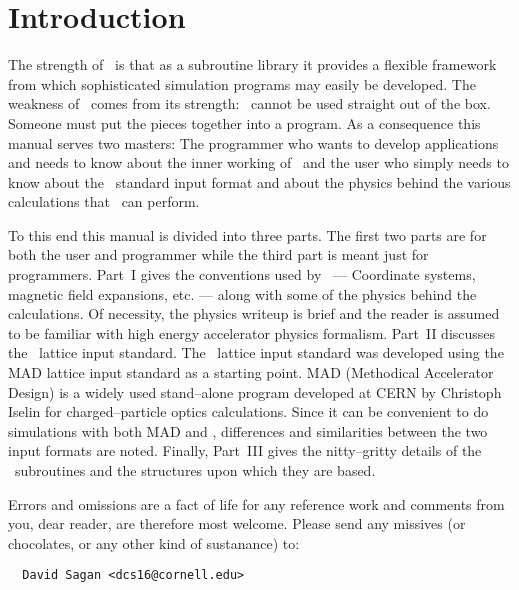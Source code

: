 \section*{Introduction}

The strength of \bmad\ is that as a subroutine library it provides a
flexible framework from which sophisticated simulation programs may
easily be developed.  The weakness of \bmad\ comes from its strength:
\bmad\ cannot be used straight out of the box. Someone must put the
pieces together into a program. As a consequence this manual serves
two masters: The programmer who wants to develop applications and
needs to know about the inner working of \bmad\ and the user who simply 
needs to know about
the \bmad\ standard input format and about the physics behind the various
calculations that \bmad\ can perform.

To this end this manual is divided into three parts. The first two
parts are for both the user and programmer while the third part is
meant just for programmers. Part~I gives the conventions used by
\bmad\ --- Coordinate systems, magnetic field expansions, etc. ---
along with some of the physics behind the calculations. Of necessity,
the physics writeup is brief and the reader is assumed to be familiar
with high energy accelerator physics formalism. Part~II discusses the
\bmad\ lattice input standard.  The \bmad\ lattice input standard was
developed using the MAD lattice input standard as a starting
point. MAD (Methodical Accelerator Design) is a widely used
stand--alone program developed at CERN by Christoph Iselin for
charged--particle optics calculations. Since it can be convenient
to do simulations with both MAD and \bmad, differences and
similarities between the two input formats are noted. 
Finally, Part~III gives the nitty--gritty details of the \bmad\
subroutines and the structures upon which they are based.

Errors and omissions are a fact of life for any reference work and
comments from you, dear reader, are therefore most welcome. Please
send any missives (or chocolates, or any other kind of sustanance) to:
\begin{verbatim}
  David Sagan <dcs16@cornell.edu>
\end{verbatim}
